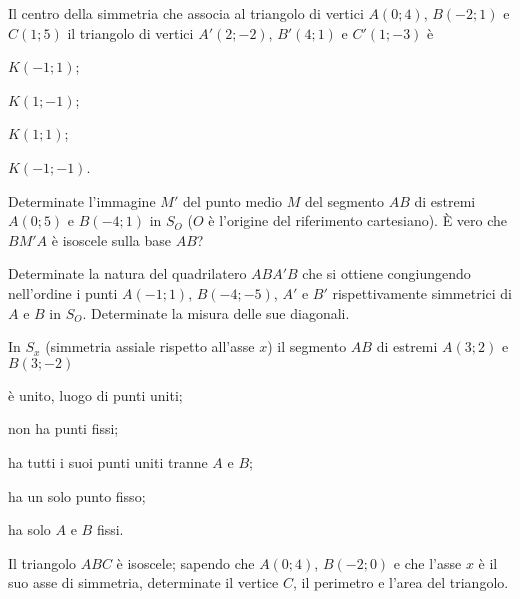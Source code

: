 \begin{esercizio}
  \label{ese:8.13}
  Il centro della simmetria che associa al triangolo di vertici 
  $A(0;4)$, $B(-2;1)$ e $C(1;5)$ il triangolo di vertici $A'(2;-2)$, 
  $B'(4;1)$ e $C'(1;-3)$ è
  \begin{multicols}{2}
    \begin{enumeratea}
      \item $K(-1;1)$;
      \item $K(1;-1)$;
      \item $K(1;1)$;
      \item $K(-1;-1)$.
    \end{enumeratea}
  \end{multicols}
\end{esercizio}

\begin{esercizio}
  \label{ese:8.14}
  Determinate l'immagine $M'$ del punto medio $M$ del segmento $AB$ di 
  estremi $A(0;5)$ e $B(-4;1)$ in $S_O$ ($O$ è l'origine del 
  riferimento cartesiano). \`E vero che $BM'A$ è isoscele sulla base 
  $AB$?
\end{esercizio}

\begin{esercizio}
  \label{ese:8.15}
  Determinate la natura del quadrilatero $ABA'B$ che si ottiene 
  congiungendo nell'ordine i punti $A(-1;1)$, $B(-4;-5)$, $A'$ e $B'$ 
  rispettivamente simmetrici di $A$ e $B$ in $S_O$. Determinate la 
  misura delle sue diagonali.
\end{esercizio}

\begin{esercizio}
  \label{ese:8.27}
  In $S_x$ (simmetria assiale rispetto all'asse $x$) il segmento $AB$ 
  di estremi $A(3;2)$ e $B(3;-2)$
  \begin{enumeratea}
    \item è unito, luogo di punti uniti;
    \item non ha punti fissi;
    \item ha tutti i suoi punti uniti tranne $A$ e $B$;
    \item ha un solo punto fisso;
    \item ha solo $A$ e $B$ fissi.
  \end{enumeratea}
\end{esercizio}

\begin{esercizio}
  \label{ese:8.29} %
  Il triangolo $ABC$ è isoscele; sapendo che $A(0;4)$, $B(-2;0)$ e che 
  l'asse $x$ è il suo asse di simmetria, determinate il vertice $C$, il 
  perimetro e l'area del triangolo.
\end{esercizio}

